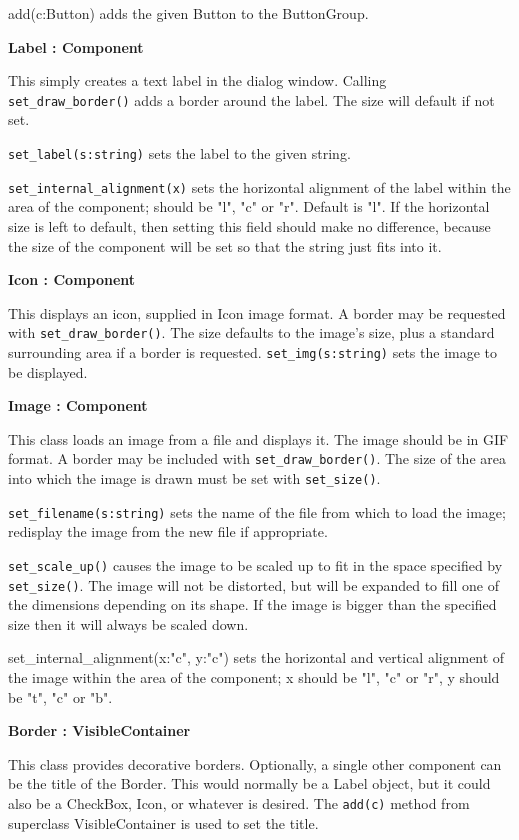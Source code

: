 add(c:Button) adds the given Button to the ButtonGroup.

{\ttfamily\bfseries
{}Label : Component}

This simply creates a text label in the dialog window. Calling
\texttt{set\_draw\_border()} adds a border around the label. The size will
default if not set.

\texttt{set\_label(s:string)} sets the label to the given string.

\texttt{set\_internal\_alignment(x)} sets the horizontal alignment of the label
within the area of the component; should be "l", "c" or "r". Default is
"l". If the horizontal size is left to
default, then setting this field should make no difference, because the
size of the component will be set so that the string just fits into it.

{\ttfamily\bfseries
{}Icon : Component}

This displays an icon, supplied in Icon image format. A border may be
requested with \texttt{set\_draw\_border()}. The size defaults to the
image's size, plus a standard surrounding area if a
border is requested. \texttt{set\_img(s:string)} sets the image to be displayed.

{\ttfamily\bfseries
{}Image : Component}

This class loads an image from a file and displays it. The image should
be in GIF format. A border may be included with \texttt{set\_draw\_border()}.
The size of the area into which the image is drawn must be set with
\texttt{set\_size()}.

\texttt{set\_filename(s:string)} sets the name of the file from which to load
the image; redisplay the image from the new file if appropriate.

\texttt{set\_scale\_up()} causes the image to be scaled up to fit in the space
specified by \texttt{set\_size()}. The image will not be distorted, but will be
expanded to fill one of the dimensions depending on its shape. If the
image is bigger than the specified size then it will always be scaled
down.

set\_internal\_alignment(x:"c",
y:"c") sets the horizontal and vertical
alignment of the image within the area of the component; x should be
"l", "c" or
"r", y should be
"t", "c" or
"b".

{\ttfamily\bfseries
{}Border : VisibleContainer}

This class provides decorative borders. Optionally, a single other
component can be the title of the Border. This would normally be a
Label object, but it could also be a CheckBox, Icon, or whatever is
desired. The \texttt{add(c)} method from superclass VisibleContainer is used to
set the title.

